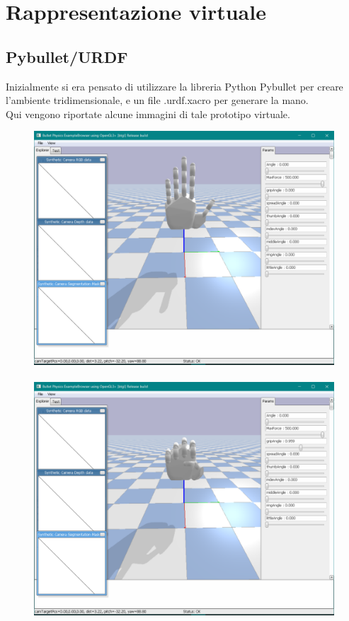 \section{Rappresentazione virtuale}

\subsection{Pybullet/URDF}

Inizialmente si era pensato di utilizzare la libreria Python Pybullet per creare l'ambiente tridimensionale, e un file .urdf.xacro per generare la mano.\\

Qui vengono riportate alcune immagini di tale prototipo virtuale.\\

\begin{figure}[htb] %
    \centering
    \subfloat
        {\includegraphics[height=.27\textheight]{immagini/pybullet urdf.PNG}}\
    \subfloat
        {\includegraphics[height=.27\textheight]{immagini/pybullet urdf grip.PNG}}
\end{figure}

